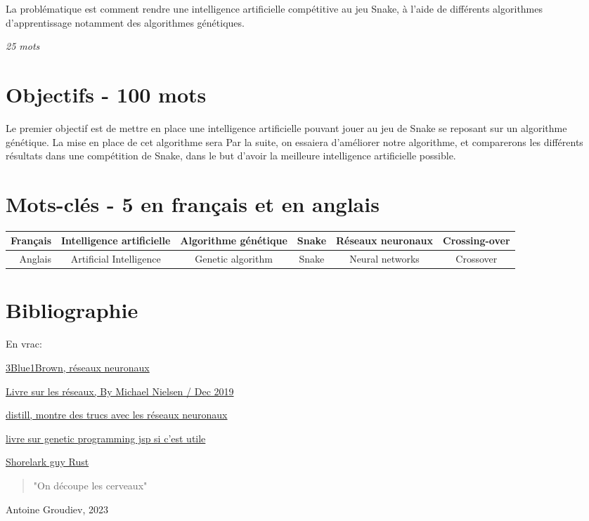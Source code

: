 \documentclass[11pt,a4paper]{article}
\begin{document}
La problématique est comment rendre une intelligence artificielle compétitive au jeu Snake, à l'aide de différents algorithmes d'apprentissage notamment des algorithmes génétiques.

\textit{25 mots}

\section{Objectifs - 100 mots}

Le premier objectif est de mettre en place une intelligence
artificielle pouvant jouer au jeu de Snake se reposant sur un
algorithme génétique.
La mise en place de cet algorithme sera
Par la suite, on essaiera d'améliorer notre algorithme, et 
comparerons les différents résultats dans une compétition de Snake,
dans le but d'avoir la meilleure intelligence artificielle possible.

\section{Mots-clés - 5 en français et en anglais}

\begin{tabular}{||r|c|c|c|c|c||} \hline
	Français & Intelligence artificielle & Algorithme génétique & Snake & Réseaux neuronaux & Crossing-over \\ \hline \hline
	Anglais & Artificial Intelligence & Genetic algorithm & Snake & Neural networks & Crossover \\
		\hline
	\end{tabular}

\section{Bibliographie}

En vrac:

\href{https://www.3blue1brown.com/topics/neural-networks}{3Blue1Brown, réseaux neuronaux}

\href{http://neuralnetworksanddeeplearning.com/index.html}{Livre sur les réseaux, By Michael Nielsen / Dec 2019}

\href{https://distill.pub}{distill, montre des trucs avec les réseaux neuronaux}

\href{http://www0.cs.ucl.ac.uk/staff/W.Langdon/ftp/papers/poli08_fieldguide.pdf}{livre sur genetic programming jsp si c'est utile}

\href{https://pwy.io/posts/learning-to-fly-pt1/}{Shorelark guy Rust}

\begin{quotation}
  "On découpe les cerveaux"
\end{quotation}
Antoine Groudiev, 2023
\end{document}
